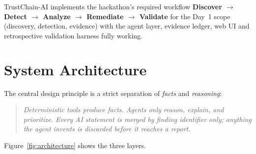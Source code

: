 \documentclass[11pt,a4paper]{article}
\begin{document}
TrustChain-AI implements the hackathon's required workflow
\textbf{Discover $\rightarrow$ Detect $\rightarrow$ Analyze $\rightarrow$ Remediate
$\rightarrow$ Validate} for the Day~1 scope (discovery, detection, evidence) with the
agent layer, evidence ledger, web UI and retrospective validation harness fully working.

\section{System Architecture}

The central design principle is a strict separation of \emph{facts} and \emph{reasoning}:

\begin{quote}
\textit{Deterministic tools produce facts. Agents only reason, explain, and prioritize.
Every AI statement is merged by finding identifier only; anything the agent invents is
discarded before it reaches a report.}
\end{quote}

Figure~\ref{fig:architecture} shows the three layers.
\end{document}
